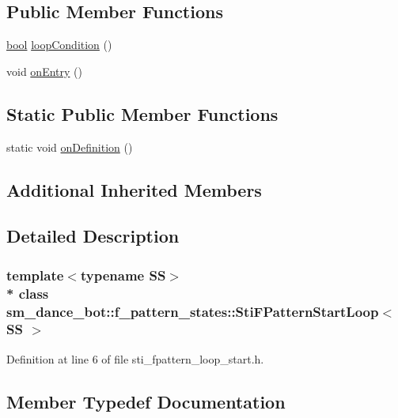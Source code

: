 \subsection*{Public Member Functions}
\begin{DoxyCompactItemize}
\item 
\hyperlink{classbool}{bool} \hyperlink{structsm__dance__bot_1_1f__pattern__states_1_1StiFPatternStartLoop_a96b8f0ea52222677cf4888165bb7df1b}{loop\+Condition} ()
\item 
void \hyperlink{structsm__dance__bot_1_1f__pattern__states_1_1StiFPatternStartLoop_a25e4397fd40697961b79b56dd15ed038}{on\+Entry} ()
\end{DoxyCompactItemize}
\subsection*{Static Public Member Functions}
\begin{DoxyCompactItemize}
\item 
static void \hyperlink{structsm__dance__bot_1_1f__pattern__states_1_1StiFPatternStartLoop_a54f8ca1ee3c9f07586afe209cced8567}{on\+Definition} ()
\end{DoxyCompactItemize}
\subsection*{Additional Inherited Members}


\subsection{Detailed Description}
\subsubsection*{template$<$typename SS$>$\\*
class sm\+\_\+dance\+\_\+bot\+::f\+\_\+pattern\+\_\+states\+::\+Sti\+F\+Pattern\+Start\+Loop$<$ S\+S $>$}



Definition at line 6 of file sti\+\_\+fpattern\+\_\+loop\+\_\+start.\+h.



\subsection{Member Typedef Documentation}
